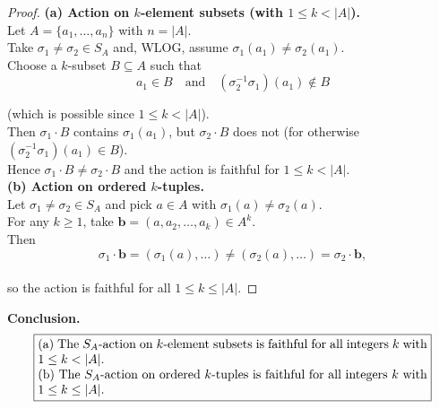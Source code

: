 \documentclass[12pt]{article}
\theoremstyle{definition}
\begin{document}
\begin{proof}
\noindent\textbf{(a) Action on $k$-element subsets (with $1\le k<|A|$).}\\

\noindent Let $A=\{a_1,\dots,a_n\}$ with $n=|A|$. \\

\noindent Take $\sigma_1\ne\sigma_2\in S_A$ and, WLOG, assume $\sigma_1(a_1)\ne\sigma_2(a_1)$. \\

\noindent Choose a $k$-subset $B\subseteq A$ such that \\

\[
a_1\in B\quad\text{and}\quad (\sigma_2^{-1}\sigma_1)(a_1)\notin B
\]

\noindent (which is possible since $1\le k<|A|$).\\

\noindent Then $\sigma_1\cdot B$ contains $\sigma_1(a_1)$, but $\sigma_2\cdot B$ does not (for otherwise $(\sigma_2^{-1}\sigma_1)(a_1)\in B$).\\

\noindent Hence $\sigma_1\cdot B\ne\sigma_2\cdot B$ and the action is faithful for $1\le k<|A|$. \\

\noindent\textbf{(b) Action on ordered $k$-tuples.}\\

\noindent Let $\sigma_1\ne\sigma_2\in S_A$ and pick $a\in A$ with $\sigma_1(a)\ne\sigma_2(a)$.\\

\noindent For any $k\ge1$, take $\mathbf{b}=(a,a_2,\dots,a_k)\in A^k$.\\

\noindent Then\\

\[
\sigma_1\cdot\mathbf{b}=(\sigma_1(a),\dots)\ne(\sigma_2(a),\dots)=\sigma_2\cdot\mathbf{b},
\]\\

\noindent so the action is faithful for all $1\le k\le |A|$.
\end{proof}

\noindent\textbf{Conclusion.}
\[
\boxed{\parbox{0.9\linewidth}{
(a) The $S_A$-action on $k$-element subsets is faithful for all integers $k$ with $1\le k<|A|$.\\
(b) The $S_A$-action on ordered $k$-tuples is faithful for all integers $k$ with $1\le k\le |A|$.
}}
\]

\newpage
\end{document}
